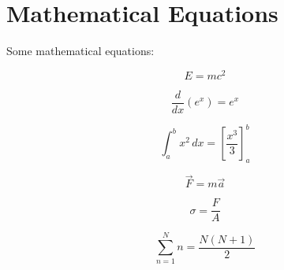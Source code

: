 \section{Mathematical Equations}

Some mathematical equations:

\begin{equation}
    E = mc^2
\end{equation}

\begin{equation}
    \frac{d}{dx} \left( e^{x} \right) = e^{x}
\end{equation}

\begin{equation}
    \int_{a}^{b} x^2 \, dx = \left[ \frac{x^3}{3} \right]_{a}^{b}
\end{equation}

\begin{equation}
    \vec{F} = m \vec{a}
\end{equation}

\begin{equation}
    \sigma = \frac{F}{A}
\end{equation}

\begin{equation}
    \sum_{n=1}^{N} n = \frac{N(N+1)}{2}
\end{equation}
